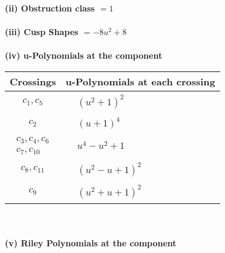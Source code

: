 \documentclass[1p]{elsarticle_modified}
\theoremstyle{definition}
\begin{document}
\flushleft \textbf{(ii) Obstruction class $= 1$}\\~\\
\flushleft \textbf{(iii) Cusp Shapes $= -8 u^2+8$}\\~\\
\newpage\renewcommand{\arraystretch}{1}
\flushleft \textbf{(iv) u-Polynomials at the component}\newline \\
\begin{tabular}{m{50pt}|m{274pt}}
Crossings & \hspace{64pt}u-Polynomials at each crossing \\
\hline $$\begin{aligned}c_{1},c_{5}\end{aligned}$$&$\begin{aligned}
&(u^2+1)^2
\end{aligned}$\\
\hline $$\begin{aligned}c_{2}\end{aligned}$$&$\begin{aligned}
&(u+1)^4
\end{aligned}$\\
\hline $$\begin{aligned}c_{3},c_{4},c_{6}\\c_{7},c_{10}\end{aligned}$$&$\begin{aligned}
&u^4- u^2+1
\end{aligned}$\\
\hline $$\begin{aligned}c_{8},c_{11}\end{aligned}$$&$\begin{aligned}
&(u^2- u+1)^2
\end{aligned}$\\
\hline $$\begin{aligned}c_{9}\end{aligned}$$&$\begin{aligned}
&(u^2+u+1)^2
\end{aligned}$\\
\hline
\end{tabular}\\~\\
\newpage\renewcommand{\arraystretch}{1}
\flushleft \textbf{(v) Riley Polynomials at the component}\newline \\
\end{document}
